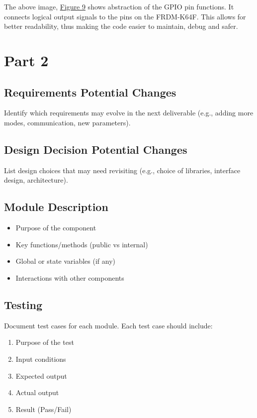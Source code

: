 \documentclass{article}
\begin{document}
The above image, \hyperref[HardHide]{Figure 9} shows abstraction of the GPIO pin functions. 
It connects logical output signals to the pins on the FRDM-K64F. This allows for better readability,
thus making the code easier to maintain, debug and safer. 



\section{Part 2}

\subsection{Requirements Potential Changes}
Identify which requirements may evolve in the next deliverable (e.g., adding more modes, communication, new parameters).

\subsection{Design Decision Potential Changes}
List design choices that may need revisiting (e.g., choice of libraries, interface design, architecture).

\subsection{Module Description}
\begin{itemize}
    \item Purpose of the component
    \item Key functions/methods (public vs internal)
    \item Global or state variables (if any)
    \item Interactions with other components
\end{itemize}

\subsection{Testing}
Document test cases for each module. Each test case should include:

\begin{enumerate}
    \item Purpose of the test
    \item Input conditions
    \item Expected output
    \item Actual output
    \item Result (Pass/Fail)
\end{enumerate}
\end{document}
